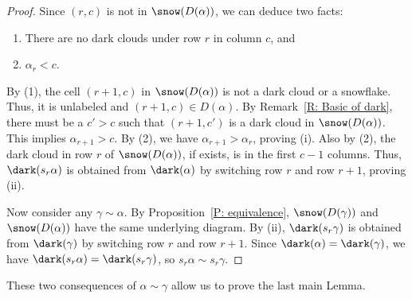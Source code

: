 \begin{proof}
Since $(r,c)$ is not in $\snow(D(\alpha))$,
we can deduce two facts:
\begin{enumerate}
\item There are no dark clouds under row $r$ in column $c$, and 
\item $\alpha_r < c$.
\end{enumerate}

By (1), the cell $(r+1,c)$ in $\snow(D(\alpha))$ 
is not a dark cloud or a snowflake.
Thus, it is unlabeled and $(r+1,c) \in D(\alpha)$.
By Remark~\ref{R: Basic of dark},
there must be a $c' > c$
such that $(r+1, c')$ is a dark cloud 
in $\snow(D(\alpha))$.
This implies $\alpha_{r+1} > c$.
By (2), 
we have $\alpha_{r+1} > \alpha_r$, 
proving (i).
Also by (2), 
the dark cloud in row $r$ of 
$\snow(D(\alpha))$,
if exists, 
is in the first $c-1$ columns. 
Thus, $\dark(s_r\alpha)$ is obtained
from $\dark(\alpha)$ by switching 
row $r$ and row $r+1$, proving (ii).

Now consider any  $\gamma \sim \alpha$.
By Proposition~\ref{P: equivalence},
$\snow(D(\gamma))$ and $\snow(D(\alpha))$
have the same underlying diagram.
By (ii), 
$\dark(s_r\gamma)$ is obtained
from $\dark(\gamma)$ by switching 
row $r$ and row $r+1$.
Since $\dark(\alpha) = \dark(\gamma)$,
we have $\dark(s_r\alpha) = \dark(s_r\gamma)$,
so $s_r \alpha \sim s_r \gamma$.
\end{proof}


These two consequences of $\alpha \sim \gamma$
allow us to prove the last main Lemma. 

